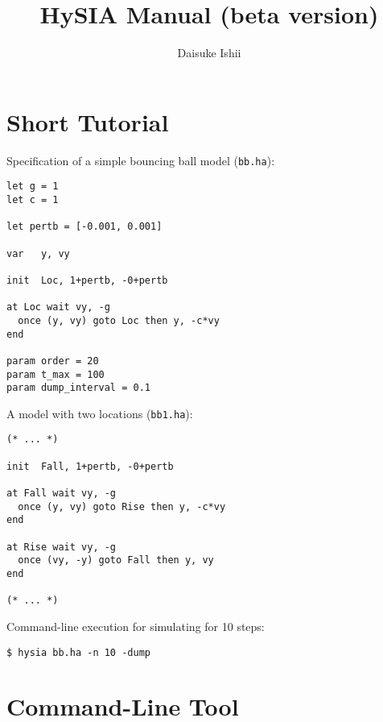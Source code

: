 \documentclass[10pt,a4paper]{article}
\begin{document}
\title{HySIA Manual (beta version)}
\author{Daisuke Ishii}

\maketitle

\setlength{\grammarparsep}{8pt plus 1pt minus 1pt} %
\setlength{\grammarindent}{8em} %

\section{Short Tutorial}

Specification of a simple bouncing ball model (\texttt{bb.ha}):
\begin{lstlisting}
let g = 1
let c = 1

let pertb = [-0.001, 0.001]

var   y, vy

init  Loc, 1+pertb, -0+pertb

at Loc wait vy, -g
  once (y, vy) goto Loc then y, -c*vy
end

param order = 20
param t_max = 100
param dump_interval = 0.1
\end{lstlisting}

A model with two locations (\texttt{bb1.ha}):
\begin{lstlisting}
(* ... *)

init  Fall, 1+pertb, -0+pertb

at Fall wait vy, -g
  once (y, vy) goto Rise then y, -c*vy
end

at Rise wait vy, -g
  once (vy, -y) goto Fall then y, vy
end

(* ... *)
\end{lstlisting}

Command-line execution for simulating for 10 steps:
\begin{verbatim}
$ hysia bb.ha -n 10 -dump
\end{verbatim}


\section{Command-Line Tool}
\end{document}
